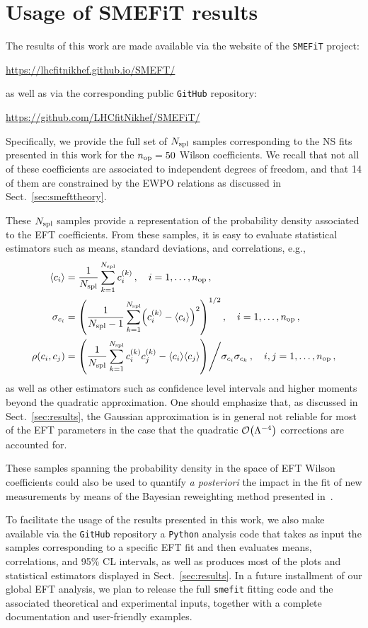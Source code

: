 \section{Usage of SMEFiT results}
\label{sec:delivery}

The results of this work are made available via
the website of the {\tt SMEFiT} project:
\begin{center}
\url{https://lhcfitnikhef.github.io/SMEFT/}
\end{center}
as well as via the corresponding public {\tt GitHub} repository:
\begin{center}
\url{https://github.com/LHCfitNikhef/SMEFiT/}
\end{center}
Specifically, we provide the full set of  $N_{\rm spl}$ samples corresponding
to the NS fits presented in this work for the $n_{\rm op}=50$ Wilson coefficients.
%
We recall that not all of these coefficients are associated to independent degrees
of freedom, and that 14 of them are constrained by the EWPO relations
as discussed in Sect.~\ref{sec:smefttheory}.

These $N_{\rm spl}$ samples provide a representation of the probability
density associated to the EFT coefficients.
%
From these samples, it is easy to evaluate statistical estimators such as
means, standard deviations, and correlations, e.g.,
\begin{align}
  \la c_i\ra &= \frac{1}{N_{\rm spl}} \sum_{k=1}^{N_{\rm spl}}c_i^{(k)} \, ,\quad i=1,\ldots,n_{\rm op} \, , \\
  \sigma_{c_i} &= \lp \frac{1}{N_{\rm spl}-1} \sum_{k=1}^{N_{\rm spl}} \lp c_i^{(k)}- \la c_i\ra
  \rp^2  \rp^{1/2} \, ,\quad i=1,\ldots,n_{\rm op} \, , \\
  \rho(c_i,c_j) &=  \lp \frac{1}{N_{\rm spl}} \sum_{k=1}^{N_{\rm spl}}c_i^{(k)}c_j^{(k)} -
  \la c_i\ra\la c_j\ra \rp \Bigg/ \sigma_{c_i} \sigma_{c_k}
  \, ,\quad i,j=1,\ldots,n_{\rm op} \, , 
\end{align}
as well as other estimators such as confidence level intervals and higher moments beyond
the quadratic approximation.
%
One should emphasize that, as discussed in Sect.~\ref{sec:results}, the Gaussian approximation
is in general not reliable for most of the EFT parameters
in the case that  the quadratic
$\mathcal{O}\lp \Lambda^{-4}\rp$ corrections are accounted for.

These samples spanning the probability density in the space of
EFT Wilson coefficients could also be used to quantify {\it a posteriori} the impact
in the fit of new measurements by means of the Bayesian reweighting method
presented in~\cite{vanBeek:2019evb}.

To facilitate the usage of the results presented in this work, we also make available
via the {\tt GitHub} repository
a {\tt Python} analysis code that takes as input the samples corresponding
to a specific EFT fit and then evaluates means, correlations, and 95\% CL intervals,
as well as produces most of the plots and statistical estimators
displayed in Sect.~\ref{sec:results}.
%
In a future installment of our global EFT analysis,
we plan to release the full {\tt smefit} fitting code and the associated
theoretical and experimental inputs, together with a complete documentation
and user-friendly examples.

